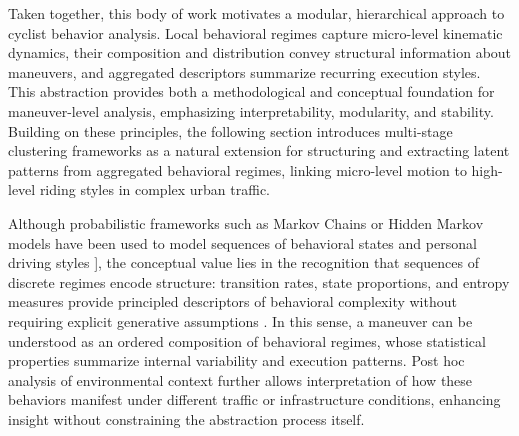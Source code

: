 Taken together, this body of work motivates a modular, hierarchical approach to cyclist behavior analysis. Local behavioral regimes capture micro-level kinematic dynamics, their composition and distribution convey structural information about maneuvers, and aggregated descriptors summarize recurring execution styles. This abstraction provides both a methodological and conceptual foundation for maneuver-level analysis, emphasizing interpretability, modularity, and stability. Building on these principles, the following section introduces multi-stage clustering frameworks as a natural extension for structuring and extracting latent patterns from aggregated behavioral regimes, linking micro-level motion to high-level riding styles in complex urban traffic.


\iffalse
Although probabilistic frameworks such as Markov Chains or Hidden Markov models have been used to model sequences of behavioral states \cite{khattak_analysis_2017, yin_extracting_2022, he_multi-scenario_2025} and personal driving styles \cite{meng_human_2006,zou_multivariate_2022}], the conceptual value lies in the recognition that sequences of discrete regimes encode structure: transition rates, state proportions, and entropy measures provide principled descriptors of behavioral complexity without requiring explicit generative assumptions \cite{vegetabile_estimating_2019}. In this sense, a maneuver can be understood as an ordered composition of behavioral regimes, whose statistical properties summarize internal variability and execution patterns. Post hoc analysis of environmental context further allows interpretation of how these behaviors manifest under different traffic or infrastructure conditions, enhancing insight without constraining the abstraction process itself.

